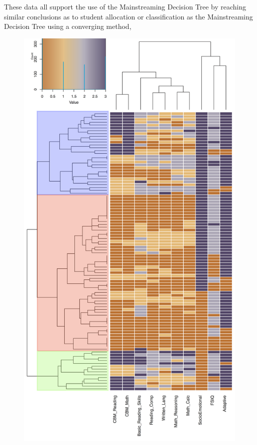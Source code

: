 \documentclass[twoside]{article}
\begin{document}
These data all support the use of the Mainstreaming Decision Tree by reaching similar conclusions as to student allocation or classification as the Mainstreaming Decision Tree using a converging method, 
%
%
%
%
\begin{figure}[htp!]
	\centering
	\includegraphics[width=\textwidth,height=\textheight]{Heatmap_Overall.png}
	\caption[Overall Predictive Results of Decision Algorithm]{\textit{           }}
	\label{fig3}
\end{figure}
%
%
%
%
\end{document}
